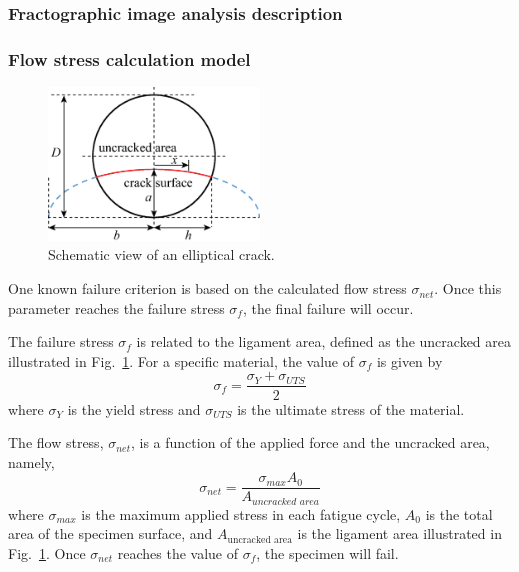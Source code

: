 \documentclass{ieeeaccess}
\begin{document}
\subsubsection{Fractographic image analysis description}
\label{Subsec: Fractographic image analysis}

\subsubsection{Flow stress calculation model}
\label{Subsec: Flow stress calculation model}
\begin{figure}[!t]
  \begin{center}
  \includegraphics[width=0.5\textwidth]{elliptical_surface_crack.eps}
  \caption{Schematic view of an elliptical crack.}
  \label{fig:elliptical_crack}
   \end{center}
\end{figure}

One known failure criterion is based on the calculated flow stress $\sigma_{net}$. Once this parameter reaches the failure stress $\sigma_{f}$, the final failure will occur.

The failure stress \(\sigma_{f}\) is related to the ligament area, defined as the uncracked area illustrated in Fig.~\ref{fig:elliptical_crack}. For a specific material, the value of \(\sigma_{f}\) is given by \cite{kanchanomai2004low}
%
\begin{equation}
    \sigma_{f} = \frac{\sigma_Y + \sigma_{UTS}}{2}
\end{equation}
%
where \(\sigma_Y\) is the yield stress and \(\sigma_{UTS}\) is the ultimate stress of the material. 

The flow stress, \(\sigma_{net}\), is a function of the applied force and the uncracked area, namely,
%
\begin{equation}
\label{eq:sig_net}
\sigma_{net}= \displaystyle\frac{\sigma_{max} A_0}{A_{\textit{uncracked area}}}
\end{equation}
%
where $\sigma_{max}$ is the maximum applied stress in each fatigue cycle, \(A_0\) is the total area of the specimen surface, and \(A_{\text{uncracked area}}\) is the ligament area illustrated in Fig.~\ref{fig:elliptical_crack}. Once \(\sigma_{net}\) reaches the value of \(\sigma_f\), the specimen will fail.
%
%
\end{document}
